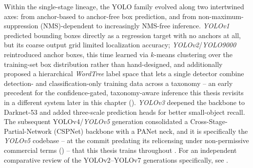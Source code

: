 Within the single-stage lineage, the YOLO family evolved along two intertwined axes: from anchor-based to anchor-free box prediction, and from non-maximum-suppression (NMS)-dependent to increasingly NMS-free inference. \textit{YOLOv1} \cite{redmonYouOnlyLook2016a} predicted bounding boxes directly as a regression target with no anchors at all, but its coarse output grid limited localization accuracy; \textit{YOLOv2}/\textit{YOLO9000} \cite{redmonYOLO9000BetterFaster2017} reintroduced anchor boxes, this time learned via $k$-means clustering over the training-set box distribution rather than hand-designed, and additionally proposed a hierarchical \textit{WordTree} label space that lets a single detector combine detection- and classification-only training data across a taxonomy -- an early precedent for the confidence-gated, taxonomy-aware inference this thesis revisits in a different system later in this chapter (). \textit{YOLOv3} \cite{redmonYOLOv3IncrementalImprovement2018} deepened the backbone to Darknet-53 and added three-scale prediction heads for better small-object recall. The subsequent YOLOv4/\textit{YOLOv5} generation consolidated a Cross-Stage-Partial-Network (CSPNet) backbone with a PANet neck, and it is specifically the \textit{YOLOv5} \cite{jocher_yolov5_2020} codebase -- at the commit predating its relicensing under non-permissive commercial terms () -- that this thesis trains throughout . For an independent comparative review of the YOLOv2--YOLOv7 generations specifically, see \cite{nazirYouOnlyLook2023}.

